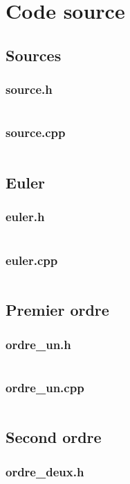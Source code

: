 \documentclass{report}
\begin{document}
\appendix
{}
\chapter{Code source}
\section{Sources}
\subsection{source.h}
\inputminted[linenos,fontsize=\scriptsize]{c++}{../src/source.h}
\subsection{source.cpp}
\inputminted[linenos,fontsize=\scriptsize]{c++}{../src/source.cpp}

\section{Euler}
\subsection{euler.h}
\inputminted[linenos,fontsize=\scriptsize]{c++}{../src/euler.h}
\subsection{euler.cpp}
\inputminted[linenos,fontsize=\scriptsize]{c++}{../src/euler.cpp}

\section{Premier ordre}
\subsection{ordre\_un.h}
\inputminted[linenos,fontsize=\scriptsize]{c++}{../src/source.h}
\subsection{ordre\_un.cpp}
\inputminted[linenos,fontsize=\scriptsize]{c++}{../src/source.cpp}

\section{Second ordre}
\subsection{ordre\_deux.h}
\inputminted[linenos,fontsize=\scriptsize]{c++}{../src/source.h}
\end{document}
